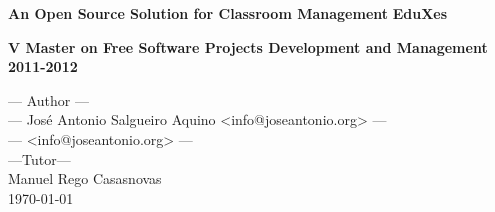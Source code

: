 \documentclass[twoside,a4paper,12pt]{book}
\begin{document}
\renewcommand{\captionlabelfont}{\textbf}

\pagestyle{fancy}

\fancyhf{}
%
\renewcommand{\headrulewidth}{0.5pt}

\fancyhead[LO]{\rightmark} %

\fancyhead[RE]{\leftmark} %

\fancyhead[RO,LE]{\thepage} %
%

\thispagestyle{empty}

\baselineskip

\vspace{2cm}
%
%
\begin{center}

%
\vspace{5mm}

%

%
\vspace{4.5cm}
%
%
%

{\Large {\bf An Open Source Solution for Classroom Management}}
\vspace{0.5cm}
{\Large {\bf EduXes}}
\vspace{3cm}

%
{\large {\bf 
V Master on Free Software Projects Development and Management 2011-2012}}
%
%
\vspace{4cm}


--- Author --- \\

--- Jos\'e Antonio Salgueiro Aquino <info@joseantonio.org>  ---\\

--- <info@joseantonio.org> ---\\
\vspace{1cm}
---Tutor---\\ 
Manuel Rego Casasnovas\\
\vspace{1cm} \today

%
\end{center}
\newpage{\pagestyle{empty}\cleardoublepage}
\end{document}
